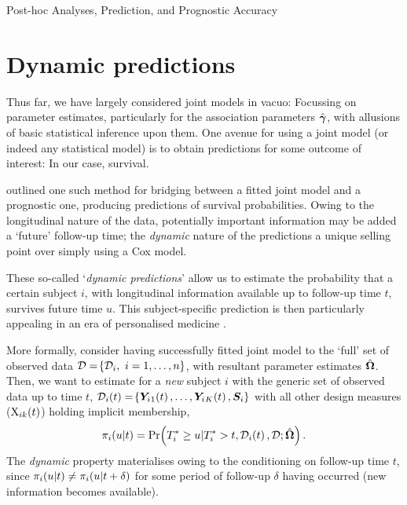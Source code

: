 \begin{chapter}{\label{cha:posthoc}Post-hoc Analyses, Prediction, and Prognostic Accuracy}
\section{Dynamic predictions}\label{sec:posthoc-dynpreds-intro}
Thus far, we have largely considered joint models in vacuo: Focussing on parameter estimates, particularly for the association parameters $\hat{\bm{\gamma}}$, with allusions of basic statistical inference upon them. One avenue for using a joint model (or indeed any statistical model) is to obtain predictions for some outcome of interest: In our case, survival.

\citet{Rizopoulos2011} outlined one such method for bridging between a fitted joint model and a prognostic one, producing predictions of survival probabilities. Owing to the longitudinal nature of the data, potentially important information may be added a `future' follow-up time; the \textit{dynamic} nature of the predictions a unique selling point over \eg simply using a Cox model.  

These so-called `\textit{dynamic predictions}' allow us to estimate the probability that a certain subject $i$, with longitudinal information available up to follow-up time $t$, survives future time $u$. This subject-specific prediction is then particularly appealing in an era of personalised medicine \citep{RizopoulosJMbook}.

More formally, consider having successfully fitted joint model to the `full' set of observed data $\mathcal{D}=\lbr\mathcal{D}_i,\ i=1,\dots,n\rbr$, with resultant parameter estimates $\hat{\bm{\Omega}}$. Then, we want to estimate for a \textit{new} subject $i$ with the generic set of observed data up to time $t$, $\mathcal{D}_i\!\left( t\right)=\!\left\{\bm{Y}_i{_1}\!\left( t\right),\dots,\bm{Y}_i{_K}\!\left( t\right),\bm{S}_i\right\}$ with all other design measures (\eg $\mathrm{X}_{ik}\!\left( t\right)$) holding implicit membership,
\begin{equation}
    \pi_i\!\left( u|t\right) = \Pr\!\left( T_i^*\ge u|T_i^*>t,\mathcal{D}_i\!\left( t\right),\mathcal{D};\hat{\bm{\Omega}}\right).
\label{eq:posthoc-prob(u|t)}
\end{equation}
The \textit{dynamic} property materialises owing to the conditioning on follow-up time $t$, since $\pi_i\!\left( u|t\right)\neq\pi_i\!\left( u|t+\delta\right)$ for some period of follow-up $\delta$ having occurred (\ie new information becomes available). 


\end{chapter}
